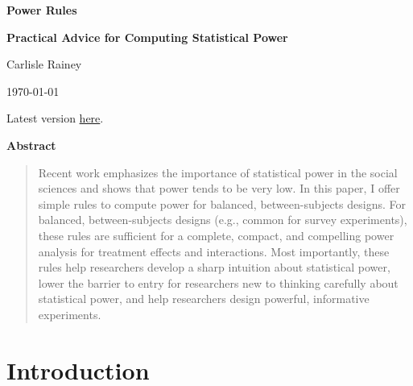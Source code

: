 \documentclass[12pt]{article}
\newcommand{\titlemain}{Power Rules}
\newcommand{\titlesub}{Practical Advice for Computing Statistical Power}
\begin{document}
\begin{center}
{\huge \textbf{\titlemain}}

\vspace{0.4cm}

{\Large\textbf{\titlesub}}

\vspace{1cm}

Carlisle Rainey

\vspace{1cm}
\today
\vspace{5mm}

Latest version \href{https://osf.io/preprints/osf/5am9q}{here}.
\end{center}

\vspace{5mm}

{\centerline{\textbf{Abstract}}}
\begin{quote}\noindent
Recent work emphasizes the importance of statistical power in the social sciences and shows that power tends to be very low.
In this paper, I offer simple rules to compute power for balanced, between-subjects designs.
For balanced, between-subjects designs (e.g., common for survey experiments), these rules are sufficient for a complete, compact, and compelling power analysis for treatment effects and interactions.
Most importantly, these rules help researchers develop a sharp intuition about statistical power, lower the barrier to entry for researchers new to thinking carefully about statistical power, and help researchers design powerful, informative experiments.
\end{quote}

\thispagestyle{empty}
\newpage

\doublespace
\setcounter{page}{1}


\section*{Introduction}
\end{document}
